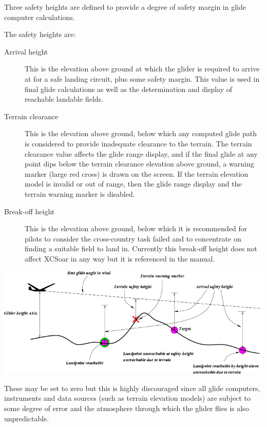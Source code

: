 \documentclass[a4paper,12pt]{refrep}
\begin{document}
Three safety heights are defined to provide a degree of safety margin
in glide computer calculations.  

The safety heights are:
\begin{description}
\item[Arrival height]  This is the elevation above ground at which
 the glider is required to arrive at for a safe landing circuit, plus
 some safety margin.  This value is used in final glide calculations as
 well as the determination and display of reachable landable fields.
\item[Terrain clearance]
 This is the elevation above ground, below which any computed glide
 path is considered to provide inadequate clearance to the terrain.
 The terrain clearance value affects the glide range display, and if
 the final glide at any point dips below the terrain clearance
 elevation above ground, a warning marker (large red cross) is drawn
 on the screen.  If the terrain elevation model is invalid or out of
 range, then the glide range display and the terrain warning marker is
 disabled.
\item[Break-off height]  This is the elevation above ground, below which 
 it is recommended for pilots to consider the cross-country task
 failed and to concentrate on finding a suitable field to land in.
 Currently this break-off height does not affect XCSoar in any way but
 it is referenced in the manual.
\end{description}

\begin{maxipage}
\begin{center}
\includegraphics[angle=0,width=\linewidth,keepaspectratio='true']{figures/fig-terrain.png}
\end{center}
\end{maxipage}

\warning
These may be set to zero but this is highly discouraged since all
glide computers, instruments and data sources (such as terrain
elevation models) are subject to some degree of error and the
atmosphere through which the glider flies is also unpredictable.
\end{document}
